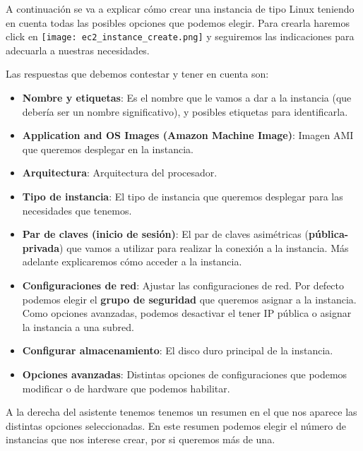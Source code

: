 A continuación se va a explicar cómo crear una instancia de tipo Linux teniendo en cuenta todas las posibles opciones que podemos elegir. Para crearla haremos click en \texttt{[image: ec2\_instance\_create.png]} y seguiremos las indicaciones para adecuarla a nuestras necesidades.

Las respuestas que debemos contestar y tener en cuenta son:

\begin{itemize}
	\item \textbf{Nombre y etiquetas}: Es el nombre que le vamos a dar a la instancia (que debería ser un nombre significativo), y posibles etiquetas para identificarla.
	
	\item \textbf{Application and OS Images (Amazon Machine Image)}: Imagen AMI que queremos desplegar en la instancia.
	
	\item \textbf{Arquitectura}: Arquitectura del procesador.
	
	\item \textbf{Tipo de instancia}: El tipo de instancia que queremos desplegar para las necesidades que tenemos.
	
	\item \textbf{Par de claves (inicio de sesión)}: El par de claves asimétricas (\textbf{pública-privada}) que vamos a utilizar para realizar la conexión a la instancia. Más adelante explicaremos cómo acceder a la instancia. 
	
	
	\item \textbf{Configuraciones de red}: Ajustar las configuraciones de red. Por defecto podemos elegir el \textbf{grupo de seguridad} que queremos asignar a la instancia. Como opciones avanzadas, podemos desactivar el tener IP pública o asignar la instancia a una subred.
	
	\item \textbf{Configurar almacenamiento}: El disco duro principal de la instancia.
	
	\item \textbf{Opciones avanzadas}: Distintas opciones de configuraciones que podemos modificar o de hardware que podemos habilitar.
\end{itemize}

A la derecha del asistente tenemos tenemos un resumen en el que nos aparece las distintas opciones seleccionadas. En este resumen podemos elegir el número de instancias que nos interese crear, por si queremos más de una.

